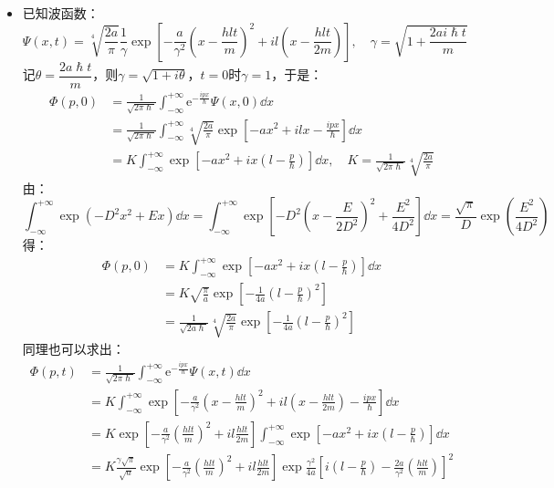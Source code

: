 \documentclass[a4paper,fontset=none]{ctexart}
\renewcommand\hbar\hslash
\begin{document}
\begin{itemize}
        \item[49.(b)]
        已知波函数：
        \[
            \Psi(x,t) = \sqrt[4]{\frac{2a}{\pi}} \frac{1}{\gamma} \exp[-\frac{a}{\gamma^2}\left(x - \frac{hlt}{m}\right)^2 + il\left(x - \frac{hlt}{2m}\right)],\quad \gamma = \sqrt{1 + \frac{2ai\hbar t}{m}}
        \]
        记$\theta = \dfrac{2a\hbar t}{m}$，则$\gamma = \sqrt{1+i\theta}$，$t = 0$时$\gamma = 1$，于是：
        \begin{align*}
            \Phi(p,0)
            &= \frac{1}{\sqrt{2\pi\hbar}} \int_{-\infty}^{+\infty} \mathrm{e}^{-\tfrac{ipx}{\hbar}} \Psi(x,0) \dd{x} \\
            &= \frac{1}{\sqrt{2\pi\hbar}} \int_{-\infty}^{+\infty} \sqrt[4]{\frac{2a}{\pi}} \exp[-ax^2 + ilx - \frac{ipx}{\hbar}] \dd{x} \\
            &= K \int_{-\infty}^{+\infty} \exp[-ax^2 + ix \left(l - \frac{p}{\hbar}\right)] \dd{x},\quad K = \frac{1}{\sqrt{2\pi\hbar}} \sqrt[4]{\frac{2a}{\pi}}
        \end{align*}
        由：
        \[
            \int_{-\infty}^{+\infty} \exp(-D^2 x^2 + Ex) \dd{x}
            = \int_{-\infty}^{+\infty} \exp[-D^2 \left(x - \frac{E}{2D^2}\right)^2 + \frac{E^2}{4D^2}] \dd{x}
            = \frac{\sqrt{\pi}}{D} \exp(\frac{E^2}{4D^2})
        \]
        得：
        \begin{align*}
            \Phi(p,0)
            &= K \int_{-\infty}^{+\infty} \exp[-ax^2 + ix \left(l - \frac{p}{\hbar}\right)] \dd{x} \\
            &= K \sqrt{\frac{\pi}{a}} \exp[-\frac{1}{4a} \left(l - \frac{p}{\hbar}\right)^2] \\
            &= \frac{1}{\sqrt{2a\hbar}} \sqrt[4]{\frac{2a}{\pi}} \exp[-\frac{1}{4a} \left(l - \frac{p}{\hbar}\right)^2]
        \end{align*}
        同理也可以求出：
        \begin{align*}
            \Phi(p,t)
            &= \frac{1}{\sqrt{2\pi\hbar}} \int_{-\infty}^{+\infty} \mathrm{e}^{-\tfrac{ipx}{\hbar}} \Psi(x,t) \dd{x} \\
            &= K \int_{-\infty}^{+\infty} \exp[-\frac{a}{\gamma^2}\left(x - \frac{hlt}{m}\right)^2 + il\left(x - \frac{hlt}{2m}\right) - \frac{ipx}{\hbar}] \dd{x} \\
            &= K \exp[-\frac{a}{\gamma^2} \left(\frac{hlt}{m}\right)^2 + il \frac{hlt}{2m}] \int_{-\infty}^{+\infty} \exp[-ax^2 + ix \left(l - \frac{p}{\hbar}\right)] \dd{x} \\
            &= K \frac{\gamma\sqrt{\pi}}{\sqrt{a}} \exp[-\frac{a}{\gamma^2} \left(\frac{hlt}{m}\right)^2 + il \frac{hlt}{2m}] \exp{\frac{\gamma^2}{4a} \left[i\left(l - \frac{p}{\hbar}\right) - \frac{2a}{\gamma^2}\left(\frac{hlt}{m}\right)\right]^2} \\

\end{align*}
\end{itemize}
\end{document}
